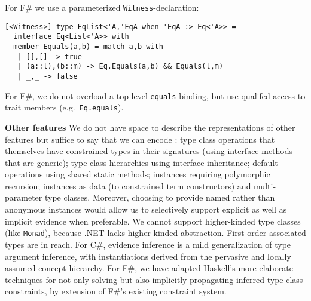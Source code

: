 \documentclass[9pt]{sig-alternate-05-2015}
\newif\ifclassic
\begin{document}
\ifclassic
For F\# we adopt the more concise, nameless declaration:

\lstset{language={FSharp}}
\begin{lstlisting}
instance Eq 'a => Eq (List 'a) where 
  Equals(a,b) = match a,b with
    | [],[] -> true
    | (a::l),(b::m) -> Equals(a,b) && Equals(l,m)
    | _,_ -> false
\end{lstlisting}
\else
For F\# we use a parameterized \lstinline{Witness}-declaration:

\begin{lstlisting}
[<Witness>] type EqList<'A,'EqA when 'EqA :> Eq<'A>> =
  interface Eq<List<'A>> with
  member Equals(a,b) = match a,b with
   | [],[] -> true
   | (a::l),(b::m) -> Eq.Equals(a,b) && Equals(l,m)
   | _,_ -> false
\end{lstlisting}
For F\#, we do not overload a top-level \lstinline{equals} binding, but use qualifed access to trait members (e.g.\ \lstinline{Eq.equals}).

\fi
{\bf Other features}
We do not have space to describe the representations of other features but suffice to say that we can encode \cite{natural}:
type class operations that themselves have constrained types in their signatures (using interface methods that are generic);
type class hierarchies  using interface inheritance; default operations using shared static methods; instances requiring 
polymorphic recursion; instances as data (to constrained term constructors) and multi-parameter type classes. Moreover, choosing to provide named rather than anonymous instances would allow us to selectively support
explicit as well as implicit evidence when preferable. 
We cannot support  higher-kinded type classes (like \lstinline{Monad}), because .NET lacks higher-kinded abstraction.
First-order associated types are in reach.
For C\#, evidence inference is a mild generalization of type argument inference, with instantiations derived from the pervasive and locally assumed concept hierarchy.
For F\#, we have adapted Haskell's more elaborate techniques for not only solving but also implicitly propagating inferred type class constraints, by extension of F\#'s existing constraint system.
\end{document}
